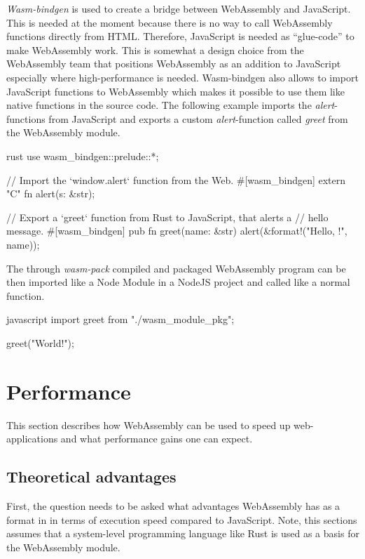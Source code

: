 \textit{Wasm-bindgen} is used to create a bridge between WebAssembly and JavaScript. This is needed at the moment because there is no way to call WebAssembly functions directly from HTML. Therefore, JavaScript is needed as ``glue-code'' to make WebAssembly work. This is somewhat a design choice from the WebAssembly team that positions WebAssembly as an addition to JavaScript especially where high-performance is needed. Wasm-bindgen also allows to import JavaScript functions to WebAssembly which makes it possible to use them like native functions in the source code. The following example imports the \textit{alert}-functions from JavaScript and exports a custom \textit{alert}-function called \textit{greet} from the WebAssembly module.
\begin{listing}
\begin{code}[]{rust}
use wasm_bindgen::prelude::*;

// Import the `window.alert` function from the Web.
#[wasm_bindgen]
extern "C" {
    fn alert(s: &str);
}

// Export a `greet` function from Rust to JavaScript, that alerts a
// hello message.
#[wasm_bindgen]
pub fn greet(name: &str) {
    alert(&format!("Hello, {}!", name));
}  
\end{code}
\caption{Rust source-code for WebAssembly \cite{rust:wasmbindgen}}
\label{lst:rust-wasm-bindgen}
\end{listing}
The through \textit{wasm-pack} compiled and packaged WebAssembly program can be then imported like a Node Module in a NodeJS project and called like a normal function.
\begin{listing}
\begin{code}[]{javascript}
import { greet } from "./wasm_module_pkg";

greet("World!");
\end{code}
\caption{Calling a WebAssembly function through JavaScript \cite{rust:wasmbindgen}}
\label{lst:js-wasm-bindgen}
\end{listing}

\newpage

\label{sec:performance}
\section{Performance}
This section describes how WebAssembly can be used to speed up web-applications and what performance gains one can expect.
\subsection{Theoretical advantages}
First, the question needs to be asked what advantages WebAssembly has as a format in in terms of execution speed compared to JavaScript. Note, this sections assumes that a system-level programming language like Rust is used as a basis for the WebAssembly module.

